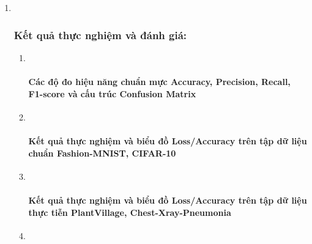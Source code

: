 \documentclass[
]{article}
\begin{document}
\begin{enumerate}
\def\labelenumi{\arabic{enumi}.}
\setcounter{enumi}{1}
\item ~
  \hypertarget{kux1ebft-quux1ea3-thux1ef1c-nghiux1ec7m-vuxe0-ux111uxe1nh-giuxe1}{%
  \subsubsection{Kết quả thực nghiệm và đánh
  giá:}\label{kux1ebft-quux1ea3-thux1ef1c-nghiux1ec7m-vuxe0-ux111uxe1nh-giuxe1}}

  \begin{enumerate}
  \def\labelenumii{\arabic{enumii}.}
  \item ~
    \hypertarget{cuxe1c-ux111ux1ed9-ux111o-hiux1ec7u-nux103ng-chuux1ea9n-mux1ef1c-accuracy-precision-recall-f1-score-vuxe0-cux1ea5u-truxfac-confusion-matrix}{%
    \paragraph{Các độ đo hiệu năng chuẩn mực Accuracy, Precision,
    Recall, F1-score và cấu trúc Confusion
    Matrix}\label{cuxe1c-ux111ux1ed9-ux111o-hiux1ec7u-nux103ng-chuux1ea9n-mux1ef1c-accuracy-precision-recall-f1-score-vuxe0-cux1ea5u-truxfac-confusion-matrix}}
  \item ~
    \hypertarget{kux1ebft-quux1ea3-thux1ef1c-nghiux1ec7m-vuxe0-biux1ec3u-ux111ux1ed3-lossaccuracy-truxean-tux1eadp-dux1eef-liux1ec7u-chuux1ea9n-fashion-mnist-cifar-10}{%
    \paragraph{Kết quả thực nghiệm và biểu đồ Loss/Accuracy trên tập dữ
    liệu chuẩn Fashion-MNIST,
    CIFAR-10}\label{kux1ebft-quux1ea3-thux1ef1c-nghiux1ec7m-vuxe0-biux1ec3u-ux111ux1ed3-lossaccuracy-truxean-tux1eadp-dux1eef-liux1ec7u-chuux1ea9n-fashion-mnist-cifar-10}}
  \item ~
    \hypertarget{kux1ebft-quux1ea3-thux1ef1c-nghiux1ec7m-vuxe0-biux1ec3u-ux111ux1ed3-lossaccuracy-truxean-tux1eadp-dux1eef-liux1ec7u-thux1ef1c-tiux1ec5n-plantvillage-chest-xray-pneumonia}{%
    \paragraph{Kết quả thực nghiệm và biểu đồ Loss/Accuracy trên tập dữ
    liệu thực tiễn PlantVillage,
    Chest-Xray-Pneumonia}\label{kux1ebft-quux1ea3-thux1ef1c-nghiux1ec7m-vuxe0-biux1ec3u-ux111ux1ed3-lossaccuracy-truxean-tux1eadp-dux1eef-liux1ec7u-thux1ef1c-tiux1ec5n-plantvillage-chest-xray-pneumonia}}
  \item ~
    \hypertarget{phuxe2n-tuxedch-hiux1ec7n-tux1b0ux1ee3ng-suy-giux1ea3m-hiux1ec7u-nux103ng-cux1ee5c-bux1ed9-cbam-local-vuxe0-ux1b0u-thux1ebf-cux1ee7a-giux1ea3i-phuxe1p-ux111ux1ec1-xuux1ea5t-cbam-hook}{%
}
\end{enumerate}
\end{enumerate}
\end{document}
